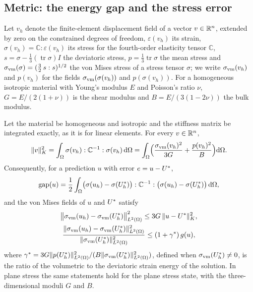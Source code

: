 \subsection{Metric: the energy gap and the stress error}\label{sec:theory:stress}

Let $v_h$ denote the finite-element displacement field of a vector $v\in\mathbb{R}^n$, extended by
zero on the constrained degrees of freedom, $\varepsilon(v_h)$ its strain,
$\sigma(v_h)=\mathbb{C}:\varepsilon(v_h)$ its stress for the fourth-order elasticity
tensor $\mathbb{C}$, $s=\sigma-\tfrac13(\operatorname{tr}\sigma)I$ the deviatoric stress,
$p=\tfrac13\operatorname{tr}\sigma$ the mean stress and $\sigma_{\mathrm{vm}}(\sigma)=(\tfrac32\,s:s)^{1/2}$
the von Mises stress of a stress tensor $\sigma$; we write $\sigma_{\mathrm{vm}}(v_h)$ and $p(v_h)$ for the
fields $\sigma_{\mathrm{vm}}(\sigma(v_h))$ and $p(\sigma(v_h))$. For a homogeneous isotropic material with
Young's modulus $E$ and Poisson's ratio $\nu$, $G=E/(2(1+\nu))$ is the shear modulus and
$B=E/(3(1-2\nu))$ the bulk modulus.

\begin{proposition}\label{prop:stress}
Let the material be homogeneous and isotropic and the stiffness matrix be integrated
exactly, as it is for linear elements. For every $v\in\mathbb{R}^{n}$,
\begin{equation}
\lVert v\rVert_K^{2} = \int_{\Omega}\sigma(v_h):\mathbb{C}^{-1}:\sigma(v_h)\,\mathrm{d}\Omega
= \int_{\Omega}\Bigl(\frac{\sigma_{\mathrm{vm}}(v_h)^{2}}{3G}+\frac{p(v_h)^{2}}{B}\Bigr)\mathrm{d}\Omega .
\label{eq:stressnorm}
\end{equation}
Consequently, for a prediction $u$ with error $e=u-U^{\ast}$,
\begin{equation}
\operatorname{gap}(u) = \frac12\int_{\Omega}\bigl(\sigma(u_h)-\sigma(U^{\ast}_h)\bigr):\mathbb{C}^{-1}:
\bigl(\sigma(u_h)-\sigma(U^{\ast}_h)\bigr)\,\mathrm{d}\Omega ,
\label{eq:gapstress}
\end{equation}
and the von Mises fields of $u$ and $U^{\ast}$ satisfy
\begin{gather}
\bigl\lVert\sigma_{\mathrm{vm}}(u_h)-\sigma_{\mathrm{vm}}(U^{\ast}_h)\bigr\rVert_{L^2(\Omega)}^{2}\le 3G\,\lVert u-U^{\ast}\rVert_K^{2},
\label{eq:vmbound}\\
\frac{\lVert\sigma_{\mathrm{vm}}(u_h)-\sigma_{\mathrm{vm}}(U^{\ast}_h)\rVert_{L^2(\Omega)}^{2}}{\lVert\sigma_{\mathrm{vm}}(U^{\ast}_h)\rVert_{L^2(\Omega)}^{2}}
\le (1+\gamma^{\ast})\,g(u),
\label{eq:vmboundrel}
\end{gather}
where $\gamma^{\ast}=3G\lVert p(U^{\ast}_h)\rVert_{L^2(\Omega)}^2/
(B\lVert\sigma_{\mathrm{vm}}(U^{\ast}_h)\rVert_{L^2(\Omega)}^2)$, defined when $\sigma_{\mathrm{vm}}(U^{\ast}_h)\neq0$, is the
ratio of the volumetric to the deviatoric strain energy of the solution. In plane stress
the same statements hold for the plane stress state, with the three-dimensional moduli $G$
and $B$.
\end{proposition}

